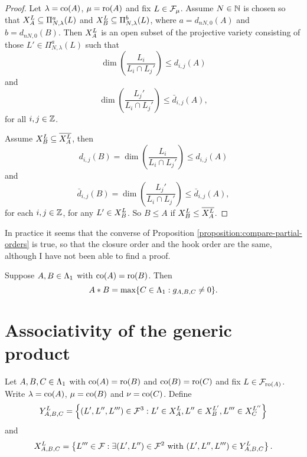\documentclass[a4paper, 11pt, twoside]{report}
\begin{document}
\begin{proof}
Let $\lambda=\co{A}$, $\mu=\ro{A}$ and fix $L\in\flags_\mu$. Assume $N\in\naturals$ is chosen so that $\xprod[L]{A}\subset\Pi_{N,\lambda}^a(L)$ and $\xprod[L]{B}\subset\Pi_{N,\lambda}^b(L)$, where $a=d_{nN,0}{(A)}$ and $b=d_{nN,0}{(B)}$. Then $\xprod[L]{A}$ is an open subset of the projective variety consisting of those $L'\in\Pi_{N,\lambda}^a(L)$ such that
\begin{equation*}
\dim\left(\frac{L_i}{L_i\cap L_j'}\right)\le d_{i,j}{(A)}
\end{equation*}
and
\begin{equation*}
\dim\left(\frac{L_j'}{L_i\cap L_j'}\right)\le\bar{d}_{i,j}{(A)},
\end{equation*}
for all $i,j\in\integers$.

Assume $\xprod[L]{B}\subset \overline{\xprod[L]{A}}$, then
\begin{equation*}
d_{i,j}{(B)} = \dim\left(\frac{L_i}{L_i\cap L_j'}\right) \le d_{i,j}{(A)}
\end{equation*}
and
\begin{equation*}
\bar{d}_{i,j}{(B)} = \dim\left(\frac{L_j'}{L_i\cap L_j'}\right) \le \bar{d}_{i,j}{(A)},
\end{equation*}
for each $i,j\in\integers$, for any $L'\in\xprod[L]{B}$. So $B\le A$ if $\xprod[L]{B}\le\overline{\xprod[L]{A}}$.
\end{proof}

\begin{remark}
In practice it seems that the converse of Proposition \ref{proposition:compare-partial-orders} is true, so that the closure order and the hook order are the same, although I have not been able to find a proof.
\end{remark}

\begin{corollary}\label{corollary:generic-is-max}
Suppose $A,B\in\matrices$ with $\co{A}=\ro{B}$. Then
\begin{equation*}
A\ast B = \max\{C\in\matrices: g_{A,B,C}\neq 0\}.
\end{equation*}
\end{corollary}


\section{Associativity of the generic product}

Let $A,B,C\in\matrices$ with $\co{A}=\ro{B}$ and $\co{B}=\ro{C}$ and fix $L\in\flags_{\ro{A}}$. Write $\lambda=\co{A}$, $\mu=\co{B}$ and $\nu=\co{C}$. Define
\begin{equation*}
\yprod[L]{A,B,C} = \left\{(L',L'',L''')\in\flags^3: L'\in\xprod[L]{A}, L''\in\xprod[L']{B}, L'''\in\xprod[L'']{C}\right\}
\end{equation*}
and
\begin{equation*}
\xprod[L]{A,B,C} = \left\{L'''\in\flags: \exists (L',L'')\in\flags^2 \text{ with } (L',L'',L''')\in\yprod[L]{A,B,C}\right\}.
\end{equation*}
\end{document}
